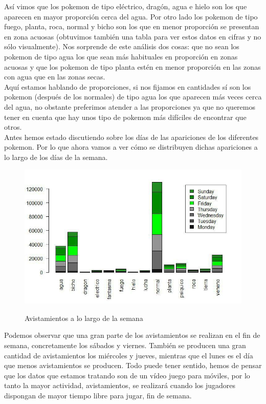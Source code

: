 Así vimos que los pokemon de tipo eléctrico, dragón, agua e hielo son los que aparecen en mayor proporción cerca del agua. Por otro lado los pokemon de tipo fuego, planta, roca, normal y bicho son los que en menor proporción se presentan en zona acuosas (obtuvimos también una tabla para ver estos datos en cifras y no sólo visualmente). Nos sorprende de este análisis dos cosas: que no sean los pokemon de tipo agua los que sean más habituales en proporción en zonas acuosas y que los pokemon de tipo planta estén en menor proporción en las zonas con agua que en las zonas secas.\\

Aquí estamos hablando de proporciones, si nos fijamos en cantidades sí son los pokemon (después de los normales) de tipo agua los que aparecen más veces cerca del agua, no obstante preferimos atender a las proporciones ya que no queremos tener en cuenta que hay unos tipo de pokemon más difíciles de encontrar que otros.\\

Antes hemos estado discutiendo sobre los días de las apariciones de los diferentes pokemon. Por lo que ahora vamos a ver cómo se distribuyen dichas apariciones a lo largo de los días de la semana.

\begin{figure}[H] %
\centering
\includegraphics[scale=0.8]{img/semana.jpg}  %
\label{img/semana.jpg}
\caption{Avistamientos a lo largo de la semana}
\end{figure}

Podemos observar que una gran parte de los avistamientos se realizan en el fin de semana, concretamente los sábados y viernes. También se producen una gran cantidad de avistamientos los miércoles y jueves, mientras que el lunes es el día que menos avistamientos se producen. Todo puede tener sentido, hemos de pensar que los datos que estamos tratando son de un vídeo juego para móviles, por lo tanto la mayor actividad, avistamientos, se realizará cuando los jugadores dispongan de mayor tiempo libre para jugar, fin de semana.\\


